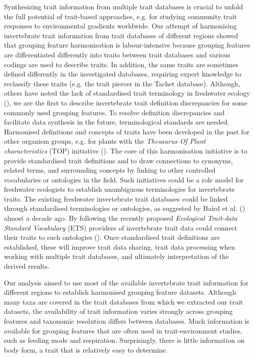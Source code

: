 \documentclass{article}
\begin{document}
Synthesizing trait information from multiple trait databases is crucial to unfold the full potential of trait-based approaches, e.g. for studying community trait responses to environmental gradients worldwide. Our attempt of harmonising invertebrate trait information from trait databases of different regions showed that grouping feature harmonisation is labour-intensive because grouping features are differentiated differently into traits between trait databases and various codings are used to describe traits. In addition, the same traits are sometimes defined differently in the investigated databases, requiring expert knowledge to reclassify these traits (e.g. the trait piercer in the Tachet database). Although, others have noted the lack of standardised trait terminology in freshwater ecology (\cite{baird_toward_2011, brink_traits-based_2011}), we are the first to describe invertebrate trait definition discrepancies for some commonly used grouping features. To resolve definition discrepancies and facilitate data synthesis in the future, terminological standards are needed. Harmonised definitions and concepts of traits have been developed in the past for other organism groups, e.g. for plants with the \textit{Thesaurus Of Plant characteristics} (TOP) initiative (\cite{garnier_towards_2017}). The core of this harmonisation initiative is to provide standardised trait definitions and to draw connections to synonyms, related terms, and surrounding concepts by linking to other controlled vocabularies or ontologies in the field. Such initiatives could be a role model for freshwater ecologists to establish unambiguous terminologies for invertebrate traits. The existing freshwater invertebrate trait databases could be linked through standardised terminologies or ontologies, as suggested by Baird et al. (\cite{baird_toward_2011}) almost a decade ago. By following the recently proposed \textit{Ecological Trait-data Standard Vocabulary} (ETS) providers of invertebrate trait data could connect their traits to such ontologies (\cite{schneider_towards_2019}). Once standardised trait definitions are established, these will improve trait data sharing, trait data processing when working with multiple trait databases, and ultimately interpretation of the derived results. 

Our analysis aimed to use most of the available invertebrate trait information for different regions to establish harmonised grouping feature datasets. Although many taxa are covered in the trait databases from which we extracted our trait datasets, the availability of trait information varies strongly across grouping features and taxonomic resolution differs between databases. Much information is available for grouping features that are often used in trait-environment studies, such as feeding mode and respiration. Surprisingly, there is little information on body form, a trait that is relatively easy to determine. 
\end{document}
